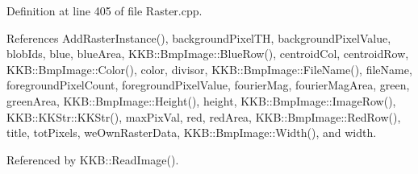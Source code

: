 Definition at line 405 of file Raster.\+cpp.



References Add\+Raster\+Instance(), background\+Pixel\+TH, background\+Pixel\+Value, blob\+Ids, blue, blue\+Area, K\+K\+B\+::\+Bmp\+Image\+::\+Blue\+Row(), centroid\+Col, centroid\+Row, K\+K\+B\+::\+Bmp\+Image\+::\+Color(), color, divisor, K\+K\+B\+::\+Bmp\+Image\+::\+File\+Name(), file\+Name, foreground\+Pixel\+Count, foreground\+Pixel\+Value, fourier\+Mag, fourier\+Mag\+Area, green, green\+Area, K\+K\+B\+::\+Bmp\+Image\+::\+Height(), height, K\+K\+B\+::\+Bmp\+Image\+::\+Image\+Row(), K\+K\+B\+::\+K\+K\+Str\+::\+K\+K\+Str(), max\+Pix\+Val, red, red\+Area, K\+K\+B\+::\+Bmp\+Image\+::\+Red\+Row(), title, tot\+Pixels, we\+Own\+Raster\+Data, K\+K\+B\+::\+Bmp\+Image\+::\+Width(), and width.



Referenced by K\+K\+B\+::\+Read\+Image().


